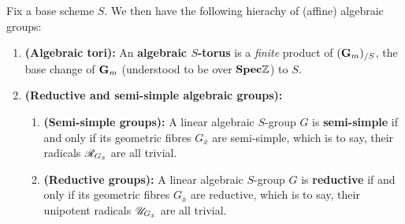                     \begin{definition} \label{def: tori_and_reductive_groups}
                        Fix a base scheme $S$. We then have the following hierachy of (affine) algebraic groups:
                        \begin{enumerate}
                            \item \textbf{(Algebraic tori):} An \textbf{algebraic $S$-torus} is a \textit{finite} product of $(\mathbf{G}_m)_{/S}$, the base change of $\mathbf{G}_m$ (understood to be over $\mathbf{Spec} \mathbb{Z}$) to $S$.
                            \item \textbf{(Reductive and semi-simple algebraic groups):} 
                                \begin{enumerate}
                                    \item \textbf{(Semi-simple groups):} A linear algebraic $S$-group $G$ is \textbf{semi-simple} if and only if its geometric fibres $G_{\bar{x}}$ are semi-simple, which is to say, their radicals $\mathscr{R}_{G_{\bar{x}}}$ are all trivial. 
                                    \item \textbf{(Reductive groups):} A linear algebraic $S$-group $G$ is \textbf{reductive} if and only if its geometric fibres $G_{\bar{x}}$ are reductive, which is to say, their unipotent radicals $\mathscr{U}_{G_{\bar{x}}}$ are all trivial.
                                \end{enumerate}
                        \end{enumerate}
                    \end{definition}
